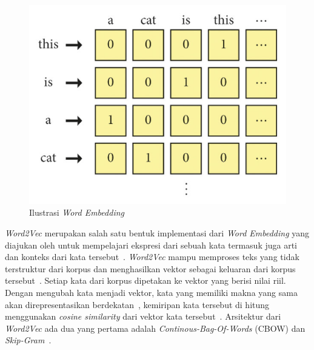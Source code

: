 \begin{figure}[H]
      \centering
      \includegraphics[scale=1.5]{assets/illustration_word_embedding.png}
      \caption{Ilustrasi \emph{Word Embedding}~\citep{Khan2021}}
      \label{fig:illustration_word_embedding}
\end{figure}

\emph{Word2Vec} merupakan salah satu bentuk implementasi dari \emph{Word Embedding} yang diajukan oleh
\citet{Mikolov2013} untuk mempelajari ekspresi dari sebuah kata termasuk juga arti
dan konteks dari kata tersebut~\citep{Jang2019}. \emph{Word2Vec} mampu memproses teks yang tidak
terstruktur dari korpus dan menghasilkan vektor sebagai keluaran dari korpus
tersebut~\citep{Nawangsari2019}. Setiap kata dari korpus dipetakan ke vektor yang berisi nilai
riil. Dengan mengubah kata menjadi vektor, kata yang memiliki makna yang sama akan direpresentasikan
berdekatan~\citep{Khattak2019}, kemiripan kata tersebut di hitung menggunakan \emph{cosine similarity}
dari vektor kata tersebut~\citep{Jang2019}. Arsitektur dari \emph{Word2Vec} ada dua yang pertama adalah \emph{Continous-Bag-Of-Words}
(CBOW) dan \emph{Skip-Gram}~\citep{Khattak2019}.

